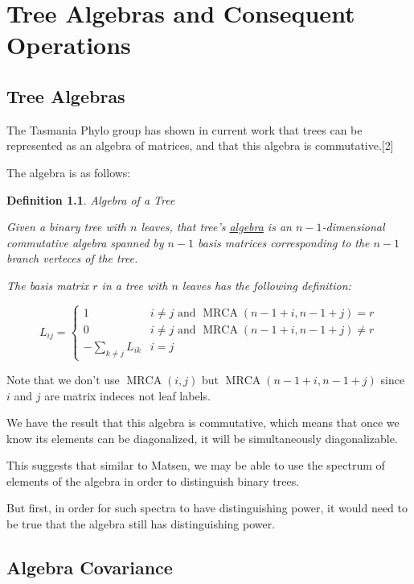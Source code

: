\documentclass[10pt,a4paper]{report}
\DeclareMathOperator{\MRCA}{MRCA}
\newtheorem{definition}{Definition}
\begin{document}
\chapter{Tree Algebras and Consequent Operations}

\section{Tree Algebras}

The Tasmania Phylo group has shown in current work that trees can be
represented as an algebra of matrices, and that this algebra is commutative.[2]

The algebra is as follows:

\begin{definition} Algebra of a Tree

	Given a binary tree with $n$ leaves, that tree's \underline{algebra} is an
	$n-1$-dimensional commutative algebra spanned by $n-1$ basis matrices
	corresponding to the $n-1$ branch verteces of the tree.

	The basis matrix $r$ in a tree with $n$ leaves has the following
	definition:

	\[ L_{ij} = \begin{cases}
		1 & i \neq j \textrm{ and } \MRCA(n-1+i, n-1+j) = r\\
		0 & i \neq j \textrm{ and } \MRCA(n-1+i, n-1+j) \neq r\\
		-\sum_{k \neq j} L_{ik} & i = j
	\end{cases} \]
\end{definition}

Note that we don't use $\MRCA(i, j)$ but $\MRCA(n-1+i, n-1+j)$ since $i$ and
$j$ are matrix indeces not leaf labels.

We have the result that this algebra is commutative, which means that once we
know its elements can be diagonalized, it will be simultaneously
diagonalizable.

This suggests that similar to Matsen, we may be able to use the spectrum of
elements of the algebra in order to distinguish binary trees.

But first, in order for such spectra to have distinguishing power, it would
need to be true that the algebra still has distinguishing power.

\section{Algebra Covariance}
\end{document}
